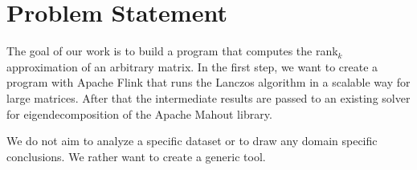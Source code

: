 \section{Problem Statement}

The goal of our work is to build a program that computes the rank$_k$ approximation of an arbitrary matrix. In the first step, we want to create a program with Apache Flink that runs the Lanczos algorithm in a scalable way for large matrices. After that the intermediate results are passed to an existing solver for eigendecomposition of the Apache Mahout library.

We do not aim to analyze a specific dataset or to draw any domain specific conclusions. We rather want to create a generic tool.